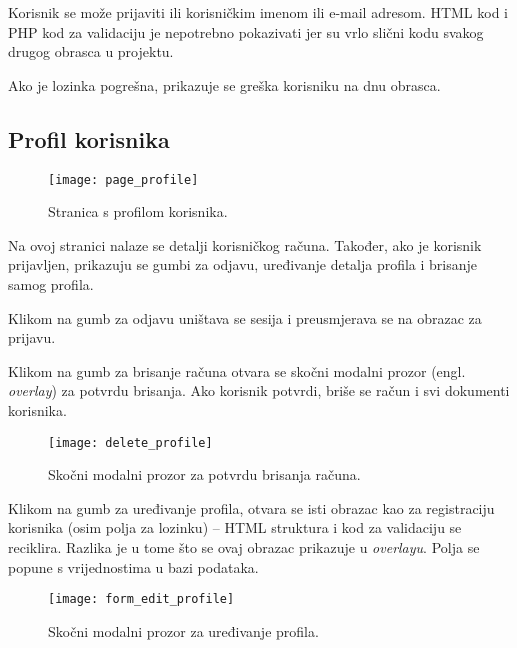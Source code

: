     Korisnik se može prijaviti ili korisničkim imenom ili e-mail adresom.
    HTML kod i PHP kod za validaciju je nepotrebno pokazivati jer su vrlo slični
    kodu svakog drugog obrasca u projektu.

    Ako je lozinka pogrešna, prikazuje se greška korisniku na dnu obrasca.

    

  \subsection{Profil korisnika}

    \begin{figure}[h]
      \texttt{[image: page\_profile]}
      \caption{Stranica s profilom korisnika.}
    \end{figure}

    Na ovoj stranici nalaze se detalji korisničkog računa. Također, ako je
    korisnik prijavljen, prikazuju se gumbi za odjavu, uređivanje detalja
    profila i brisanje samog profila.

    Klikom na gumb za odjavu uništava se sesija i preusmjerava se na obrazac za
    prijavu.

    

    Klikom na gumb za brisanje računa otvara se skočni modalni prozor (engl.
    \textit{overlay}) za potvrdu brisanja. Ako korisnik potvrdi, briše se račun
    i svi dokumenti korisnika.

    

    \begin{figure}[h]
      \centering
      \texttt{[image: delete\_profile]}
      \caption{Skočni modalni prozor za potvrdu brisanja računa.}
    \end{figure}

    Klikom na gumb za uređivanje profila, otvara se isti obrazac kao za
    registraciju korisnika (osim polja za lozinku) -- HTML struktura i kod za
    validaciju se reciklira. Razlika je u tome što se ovaj obrazac prikazuje u
    \textit{overlayu}. Polja se popune s vrijednostima u bazi podataka.

    \begin{figure}[h]
      \centering
      \texttt{[image: form\_edit\_profile]}
      \caption{Skočni modalni prozor za uređivanje profila.}
    \end{figure}

